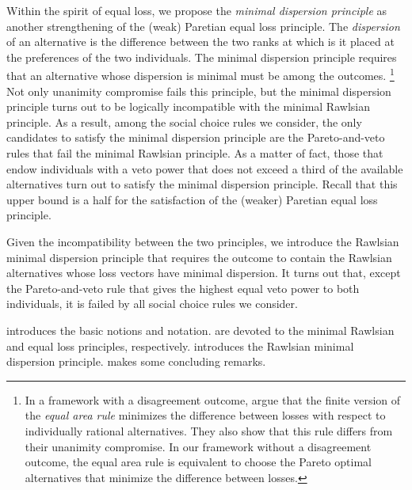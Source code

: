 \documentclass[version=3.21, pagesize, twoside=off, bibliography=totoc, DIV=calc, fontsize=12pt, a4paper]{scrartcl}
\begin{document}
Within the spirit of equal loss, we propose the \textit{minimal dispersion principle} as another strengthening of the (weak) Paretian equal loss principle. The \textit{dispersion} of an alternative is the difference between the two ranks at which is it placed at the preferences of the two individuals. The minimal dispersion principle requires that an alternative whose dispersion is minimal must be among the outcomes.%
\footnote{
\label{ft:equalarea}
In a framework with a disagreement outcome, \citet{KibrisSertel2007} argue that the finite version of the \textit{equal area rule} \citep{thomson1994cooperative} minimizes the difference between losses with respect to individually rational alternatives. They also show that this rule differs from their unanimity compromise. In our framework without a disagreement outcome, the equal area rule is equivalent to choose the Pareto optimal alternatives that minimize the difference between losses.  }
Not only unanimity compromise fails this principle, but the minimal dispersion principle turns out to be logically incompatible with the minimal Rawlsian principle. As a result, among the social choice rules we consider, the only candidates to satisfy the minimal dispersion principle are the Pareto-and-veto rules that fail the minimal Rawlsian principle. As a matter of fact, those that endow individuals with a veto power that does not exceed a third of the available alternatives turn out to satisfy the minimal dispersion principle. Recall that this upper bound is a half for the satisfaction of the (weaker) Paretian equal loss principle.

Given the incompatibility between the two principles, we introduce the Rawlsian minimal dispersion principle that requires the outcome to contain the Rawlsian alternatives whose loss vectors have minimal dispersion. It turns out that, except the Pareto-and-veto rule that gives the highest equal veto power to both individuals, it is failed by all social choice rules we consider.

 introduces the basic notions and notation.  are devoted to the minimal Rawlsian and equal loss principles, respectively.  introduces the Rawlsian minimal dispersion principle.  makes some concluding remarks.
\end{document}
